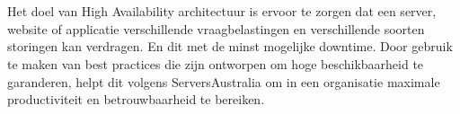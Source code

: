 








\section{}
\label{sec:High Availability}

Het doel van High Availability architectuur is ervoor te zorgen dat een server, website of applicatie verschillende vraagbelastingen en verschillende soorten storingen kan verdragen. En dit met de minst mogelijke downtime. Door gebruik te maken van best practices die zijn ontworpen om hoge beschikbaarheid te garanderen, helpt dit volgens ServersAustralia om in een organisatie maximale productiviteit en betrouwbaarheid te bereiken. %

